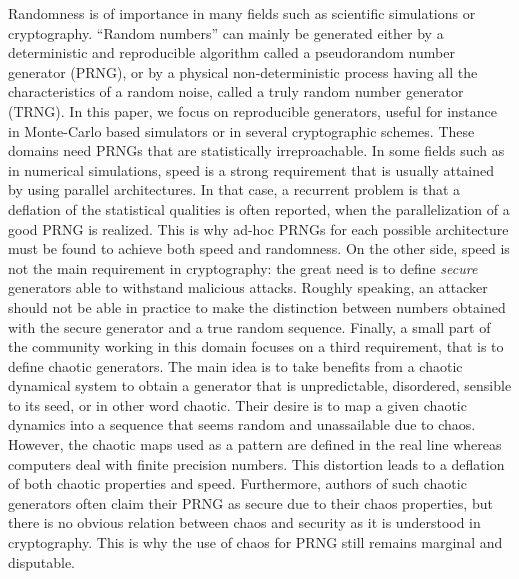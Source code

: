 \documentclass{article}
\begin{document}
Randomness is of importance in many fields such as scientific simulations or cryptography. 
``Random numbers'' can mainly be generated either by a deterministic and reproducible algorithm
called a pseudorandom number generator (PRNG), or by a physical non-deterministic 
process having all the characteristics of a random noise, called a truly random number
generator (TRNG). 
In this paper, we focus on reproducible generators, useful for instance in
Monte-Carlo based simulators or in several cryptographic schemes.
These domains need PRNGs that are statistically irreproachable. 
In some fields such as in numerical simulations, speed is a strong requirement
that is usually attained by using parallel architectures. In that case,
a recurrent problem is that a deflation of the statistical qualities is often
reported, when the parallelization of a good PRNG is realized.
This is why ad-hoc PRNGs for each possible architecture must be found to
achieve both speed and randomness.
On the other side, speed is not the main requirement in cryptography: the great
need is to define \emph{secure} generators able to withstand malicious
attacks. Roughly speaking, an attacker should not be able in practice to make 
the distinction between numbers obtained with the secure generator and a true random
sequence. 
Finally, a small part of the community working in this domain focuses on a
third requirement, that is to define chaotic generators.
The main idea is to take benefits from a chaotic dynamical system to obtain a
generator that is unpredictable, disordered, sensible to its seed, or in other word chaotic.
Their desire is to map a given chaotic dynamics into a sequence that seems random 
and unassailable due to chaos.
However, the chaotic maps used as a pattern are defined in the real line 
whereas computers deal with finite precision numbers.
This distortion leads to a deflation of both chaotic properties and speed.
Furthermore, authors of such chaotic generators often claim their PRNG
as secure due to their chaos properties, but there is no obvious relation
between chaos and security as it is understood in cryptography.
This is why the use of chaos for PRNG still remains marginal and disputable.
\end{document}
